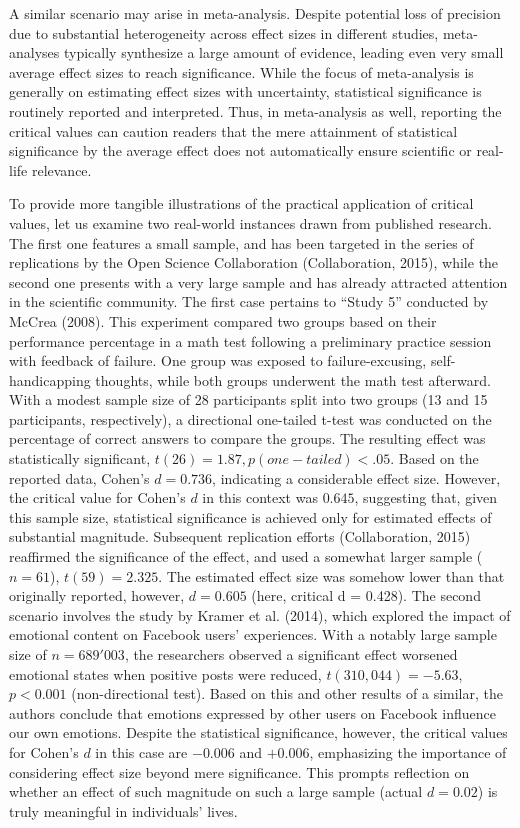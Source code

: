 \documentclass[
  man]{apa7}
\begin{document}
A similar scenario may arise in meta-analysis. Despite potential loss of precision due to substantial heterogeneity across effect sizes in different studies, meta-analyses typically synthesize a large amount of evidence, leading even very small average effect sizes to reach significance. While the focus of meta-analysis is generally on estimating effect sizes with uncertainty, statistical significance is routinely reported and interpreted. Thus, in meta-analysis as well, reporting the critical values can caution readers that the mere attainment of statistical significance by the average effect does not automatically ensure scientific or real-life relevance.

To provide more tangible illustrations of the practical application of critical values, let us examine two real-world instances drawn from published research. The first one features a small sample, and has been targeted in the series of replications by the Open Science Collaboration (Collaboration, 2015), while the second one presents with a very large sample and has already attracted attention in the scientific community. The first case pertains to ``Study 5'' conducted by McCrea (2008). This experiment compared two groups based on their performance percentage in a math test following a preliminary practice session with feedback of failure. One group was exposed to failure-excusing, self-handicapping thoughts, while both groups underwent the math test afterward. With a modest sample size of 28 participants split into two groups (13 and 15 participants, respectively), a directional one-tailed t-test was conducted on the percentage of correct answers to compare the groups. The resulting effect was statistically significant, \(t(26) = 1.87, p (one-tailed) < .05\). Based on the reported data, Cohen's \(d = 0.736\), indicating a considerable effect size. However, the critical value for Cohen's \(d\) in this context was \(0.645\), suggesting that, given this sample size, statistical significance is achieved only for estimated effects of substantial magnitude. Subsequent replication efforts (Collaboration, 2015) reaffirmed the significance of the effect, and used a somewhat larger sample (\(n = 61\)), \(t(59)=2.325\). The estimated effect size was somehow lower than that originally reported, however, \(d = 0.605\) (here, critical d = 0.428). The second scenario involves the study by Kramer et al. (2014), which explored the impact of emotional content on Facebook users' experiences. With a notably large sample size of \(n = 689'003\), the researchers observed a significant effect worsened emotional states when positive posts were reduced, \(t(310,044) = −5.63\), \(p < 0.001\) (non-directional test). Based on this and other results of a similar, the authors conclude that emotions expressed by other users on Facebook influence our own emotions. Despite the statistical significance, however, the critical values for Cohen's \(d\) in this case are \(-0.006\) and \(+0.006\), emphasizing the importance of considering effect size beyond mere significance. This prompts reflection on whether an effect of such magnitude on such a large sample (actual \(d = 0.02\)) is truly meaningful in individuals' lives.
\end{document}
